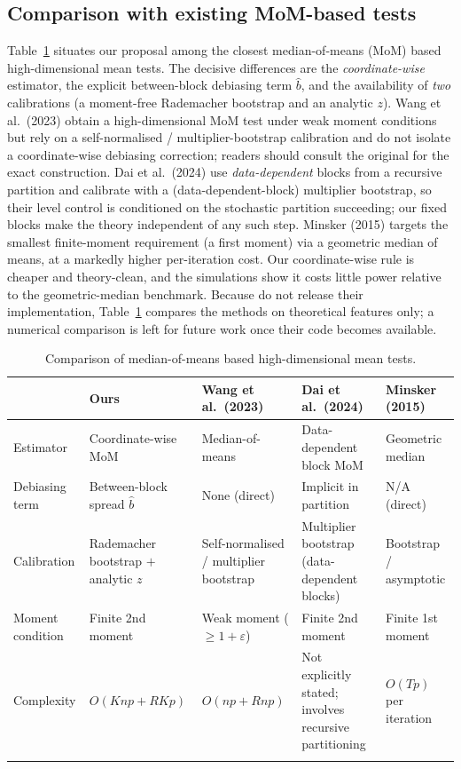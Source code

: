 \documentclass[pdflatex,sn-mathphys-num]{sn-jnl}
\theoremstyle{thmstyleone}%
\theoremstyle{thmstyletwo}%
\theoremstyle{thmstylethree}%
\begin{document}
\subsection{Comparison with existing MoM-based tests}
\label{subsec:compare}

Table~\ref{tab:compare} situates our proposal among the closest median-of-means
(MoM) based high-dimensional mean tests. The decisive differences are the
\emph{coordinate-wise} estimator, the explicit between-block debiasing term
$\hat b$, and the availability of \emph{two} calibrations (a moment-free
Rademacher bootstrap and an analytic $z$). Wang et al.\ (2023) obtain a
high-dimensional MoM test under weak moment conditions but rely on a
self-normalised / multiplier-bootstrap calibration and do not isolate a
coordinate-wise debiasing correction; readers should consult the original for
the exact construction. Dai et al.\ (2024) use \emph{data-dependent} blocks from
a recursive partition and calibrate with a (data-dependent-block) multiplier
bootstrap, so their level control is conditioned on the stochastic partition
succeeding; our fixed blocks make the theory independent of any such step.
Minsker (2015) targets the smallest finite-moment requirement (a first moment)
via a geometric median of means, at a markedly higher per-iteration cost. Our
coordinate-wise rule is cheaper and theory-clean, and the simulations show it
costs little power relative to the geometric-median benchmark.
Because \citeauthor{dai2024} \citep{dai2024} do not release their implementation,
Table~\ref{tab:compare} compares the methods on theoretical features only;
a numerical comparison is left for future work once their code becomes available.

\begin{table}[htbp]
\centering
\caption{Comparison of median-of-means based high-dimensional mean tests.}
\label{tab:compare}
\begin{tabular}{@{}p{2.5cm}p{2.9cm}p{2.7cm}p{2.7cm}p{2.4cm}@{}}
\toprule
& Ours & Wang et al.\ (2023) & Dai et al.\ (2024) & Minsker (2015) \\
\midrule
Estimator & Coordinate-wise MoM & Median-of-means & Data-dependent block MoM & Geometric median \\
Debiasing term & Between-block spread $\hat b$ & None (direct) & Implicit in partition & N/A (direct) \\
Calibration & Rademacher bootstrap $+$ analytic $z$ & Self-normalised / multiplier bootstrap & Multiplier bootstrap (data-dependent blocks) & Bootstrap / asymptotic \\
Moment condition & Finite 2nd moment & Weak moment ($\ge 1+\varepsilon$) & Finite 2nd moment & Finite 1st moment \\
Complexity & $O(Knp+RKp)$ & $O(np+Rnp)$ & Not explicitly stated; involves recursive partitioning & $O(Tp)$ per iteration \\
\botrule
\end{tabular}
\end{table}
\end{document}
